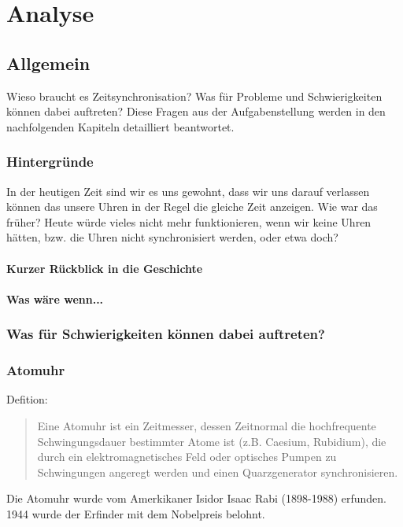 
\chapter{Analyse}

\section{Allgemein}
Wieso braucht es Zeitsynchronisation? Was für Probleme und Schwierigkeiten können dabei auftreten? Diese Fragen aus der Aufgabenstellung werden in den nachfolgenden Kapiteln detailliert beantwortet.

\subsection{Hintergründe} \label{Analyse:Hintergruende}
In der heutigen Zeit sind wir es uns gewohnt, dass wir uns darauf verlassen können das unsere Uhren in der Regel die gleiche Zeit anzeigen. 
Wie war das früher? Heute würde vieles nicht mehr funktionieren, wenn wir keine Uhren hätten, bzw. die Uhren nicht synchronisiert werden, oder etwa doch?

\subsubsection{Kurzer Rückblick in die Geschichte}
\subsubsection{Was wäre wenn...}

\subsection{Was für Schwierigkeiten können dabei auftreten?}

\subsection{Atomuhr}
Defition:
\begin{quote}
Eine Atomuhr ist ein Zeitmesser, dessen Zeitnormal die hochfrequente Schwingungsdauer bestimmter Atome ist (z.B. Caesium, Rubidium), die durch ein elektromagnetisches Feld oder optisches Pumpen zu Schwingungen angeregt werden und einen Quarzgenerator synchronisieren.
\end{quote} %
Die Atomuhr wurde vom Amerkikaner Isidor Isaac Rabi (1898-1988) erfunden. 1944 wurde der Erfinder mit dem Nobelpreis belohnt.

